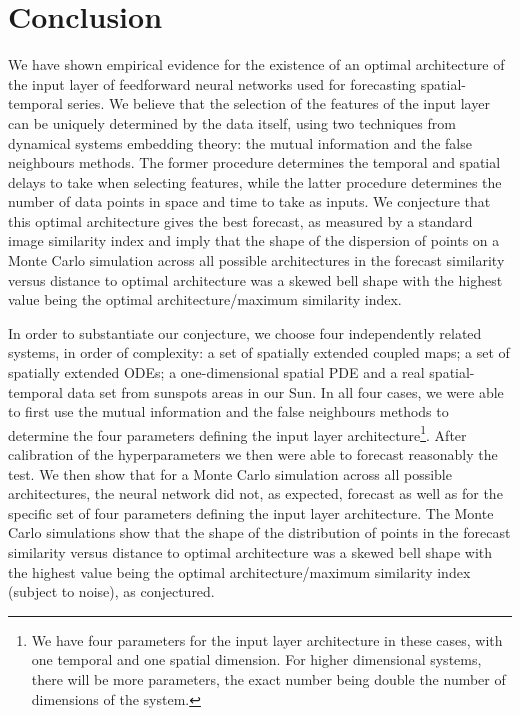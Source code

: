 \documentclass[journal]{IEEEtran}
\begin{document}




\section{Conclusion}
We have shown empirical evidence for the existence of an optimal architecture of the input layer of feedforward neural networks used for 
forecasting spatial-temporal series. We believe that the selection of the features of the input layer can be uniquely determined by 
the data itself, using two techniques from dynamical systems embedding theory: the mutual information and the false neighbours 
methods. The former procedure determines the temporal and spatial delays to take when selecting features, while the latter procedure 
determines the number of data points in space and time to take as inputs.  We conjecture that this optimal architecture gives the best 
forecast, as measured by a standard image similarity index and imply that the shape of the dispersion of points on a Monte Carlo 
simulation across all possible architectures in the forecast similarity versus distance to optimal architecture was a skewed bell  
shape with the highest value being the optimal architecture/maximum similarity index.
  
In order to substantiate our conjecture, we choose four independently related systems, in order of complexity: a set of spatially 
extended coupled maps; a set of spatially extended ODEs; a one-dimensional spatial PDE and a real spatial-temporal data set from 
sunspots areas in our Sun. In all four cases, we were able to first use the mutual information and the false neighbours methods to 
determine the four parameters defining the input layer architecture\footnote{We have four parameters for the input layer architecture 
in these cases, with one temporal and one spatial dimension. For higher dimensional systems, there will be more parameters, the exact 
number being double the number of dimensions of the system.}. After calibration of the hyperparameters we then were able to forecast 
reasonably the test. We then show that for a Monte Carlo simulation across all possible architectures, the neural network did not, 
as expected, forecast as well as for the specific set of four parameters defining the input layer architecture. The Monte Carlo 
simulations show that the shape of the distribution of points in the forecast similarity versus distance to optimal architecture was a 
skewed bell shape with the highest value being the optimal architecture/maximum similarity index (subject to noise), as conjectured.
\end{document}
